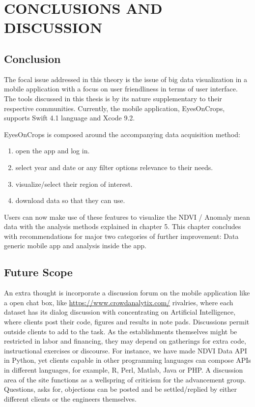 \chapter{CONCLUSIONS AND DISCUSSION}
\label{chap:conclusion}

\section{Conclusion}

The focal issue addressed in this theory is the issue of big data visualization in a mobile application with a focus on user friendliness in terms of user interface. The tools discussed in this thesis is by its nature supplementary to their respective communities. Currently, the mobile application, EyesOnCrops, supports Swift 4.1 language and Xcode 9.2.

EyesOnCrops is composed around the accompanying data acquisition method:
\begin{enumerate}
  \item open the app and log in. 
  \item select year and date or any filter options relevance to their needs.
  \item visualize/select their region of interest.
  \item download data so that they can use.
\end{enumerate}

Users can now make use of these features to visualize the NDVI / Anomaly mean data with the analysis methods explained in chapter 5. 
This chapter concludes with recommendations for major two
categories of further improvement: Data generic mobile app and analysis inside the app.

\section{Future Scope}

An extra thought is incorporate a discussion forum on the mobile application like a open chat box, like \url{https://www.crowdanalytix.com/} rivalries, where each dataset has its dialog discussion with concentrating on Artificial Intelligence, where clients post their code, figures and results in note pads. Discussions permit outside clients to add to the task. As the establishments themselves might be restricted in labor and financing, they may depend on gatherings for extra code, instructional exercises or discourse. For instance, we have made NDVI Data API in Python, yet clients capable in other programming languages can compose APIs in different languages, for example, R, Perl, Matlab, Java or PHP. A discussion area of the site functions as a wellspring of criticism for the advancement group. Questions, asks for, objections can be posted and be settled/replied by either different clients or the engineers themselves. \\

